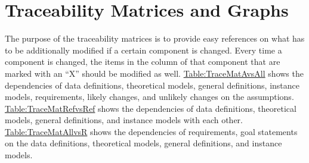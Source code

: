 \documentclass[12pt]{article}
\begin{document}
\section{Traceability Matrices and Graphs}
\label{Sec:TraceMatrices}
The purpose of the traceability matrices is to provide easy references on what has to be additionally modified if a certain component is changed. Every time a component is changed, the items in the column of that component that are marked with an ``X'' should be modified as well. \hyperref[Table:TraceMatAvsAll]{Table:TraceMatAvsAll} shows the dependencies of data definitions, theoretical models, general definitions, instance models, requirements, likely changes, and unlikely changes on the assumptions. \hyperref[Table:TraceMatRefvsRef]{Table:TraceMatRefvsRef} shows the dependencies of data definitions, theoretical models, general definitions, and instance models with each other. \hyperref[Table:TraceMatAllvsR]{Table:TraceMatAllvsR} shows the dependencies of requirements, goal statements on the data definitions, theoretical models, general definitions, and instance models.
\end{document}
